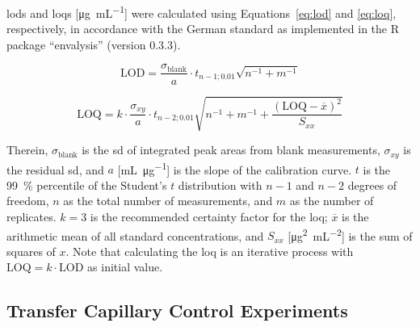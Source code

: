 \Acp{lod} and \acp{loq} [\si{\micro\gram\per\milli\liter}] were calculated using Equations~\ref{eq:lod} and \ref{eq:loq}, respectively, in accordance with the German standard \citet{DIN32645Chemical2008} as implemented in the R package ``envalysis'' (version 0.3.3).

\begin{equation}
\mathrm{LOD} = \frac{\sigma_\mathrm{blank}}{a} \cdot t_{n-1;0.01} \sqrt{n^{-1} + m^{-1}}
\label{eq:lod}
\end{equation}

\begin{equation}
\mathrm{LOQ} = k \cdot \frac{\sigma_{xy}}{a} \cdot t_{n-2;0.01} \sqrt{n^{-1} + m^{-1} + \frac{(\mathrm{LOQ}-\overline{x})^2} {S_{xx}}}
\label{eq:loq}
\end{equation}

Therein, $\sigma_\mathrm{blank}$ is the \ac{sd} of integrated peak areas from blank measurements, $\sigma_{xy}$ is the residual \ac{sd}, and $a$ [\si{\milli\liter\per\micro\gram}] is the slope of the calibration curve. $t$ is the \SI{99}{\percent} percentile of the Student's $t$ distribution with $n - 1$ and $n - 2$ degrees of freedom, $n$ as the total number of measurements, and $m$ as the number of replicates. $k = 3$ is the recommended certainty factor for the \ac{loq}; $\overline{x}$ is the arithmetic mean of all standard concentrations, and $S_{xx}$ [\si{\square\micro\gram\per\square\milli\liter}] is the sum of squares of $x$. Note that calculating the \ac{loq} is an iterative process with $\mathrm{LOQ} = k \cdot \mathrm{LOD}$ as initial value.

\subsection{Transfer Capillary Control Experiments}

